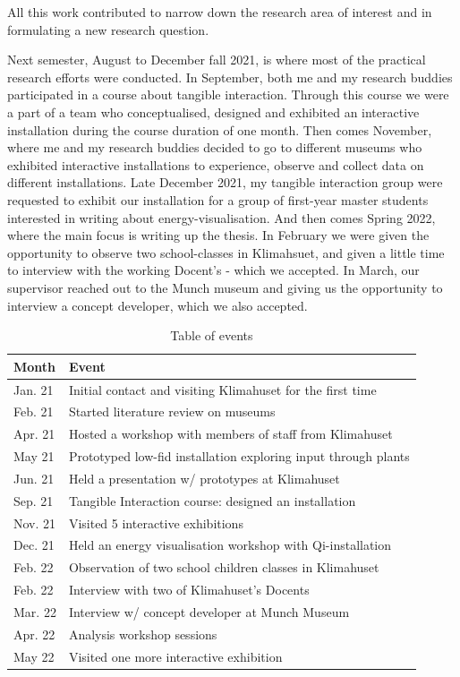 All this work contributed to narrow down the research area of interest and in formulating a new research question. 


Next semester, August to December fall 2021, is where most of the practical research efforts were conducted. In September, both me and my research buddies participated in a course about tangible interaction. Through this course we were a part of a team who conceptualised, designed and exhibited an interactive installation during the course duration of one month. Then comes November, where me and my research buddies decided to go to different museums who exhibited interactive installations to experience, observe and collect data on different installations. Late December 2021, my tangible interaction group were requested to exhibit our installation for a group of first-year master students interested in writing about energy-visualisation. And then comes Spring 2022, where the main focus is writing up the thesis. In February we were given the opportunity to observe two school-classes in Klimahsuet, and given a little time to interview with the working Docent's - which we accepted. In March, our supervisor reached out to the Munch museum and giving us the opportunity to interview a concept developer, which we also accepted.

\begin{table}[h]
\centering
\begin{tabular}{l | l}
\textbf{Month} & \textbf{Event}\\
\hline
Jan. 21 & Initial contact and visiting Klimahuset for the first time \\
Feb. 21 & Started literature review on museums \\
Apr. 21 & Hosted a workshop with members of staff from Klimahuset \\
May 21 & Prototyped low-fid installation exploring input through plants \\
Jun. 21 & Held a presentation w/ prototypes at Klimahuset \\
Sep. 21 & Tangible Interaction course: designed an installation \\
Nov. 21 & Visited 5 interactive exhibitions \\
Dec. 21 & Held an energy visualisation workshop with Qi-installation \\
Feb. 22 & Observation of two school children classes in Klimahuset \\
Feb. 22 & Interview with two of Klimahuset's Docents \\
Mar. 22 & Interview w/ concept developer at Munch Museum \\
Apr. 22 & Analysis workshop sessions \\
May 22 & Visited one more interactive exhibition \\
\end{tabular}
\caption{Table of events}
\label{tab:abc}
\end{table}

